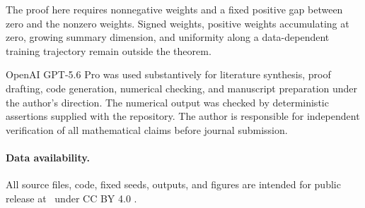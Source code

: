 \documentclass[
  aps,
  prl,
  10pt,
  onecolumn,
  longbibliography,
  nofootinbib
]{revtex4-2}
\theoremstyle{remark}
\begin{document}
The proof here requires nonnegative weights and a fixed positive gap between zero and the nonzero weights. Signed weights, positive weights accumulating at zero, growing summary dimension, and uniformity along a data-dependent training trajectory remain outside the theorem.

\begin{acknowledgments}
OpenAI GPT-5.6 Pro was used substantively for literature synthesis, proof drafting, code generation, numerical checking, and manuscript preparation under the author's direction. The numerical output was checked by deterministic assertions supplied with the repository. The author is responsible for independent verification of all mathematical claims before journal submission.
\end{acknowledgments}

\paragraph*{Data availability.}
All source files, code, fixed seeds, outputs, and figures are intended for public release at \RepositoryURL\ under CC BY 4.0 \cite{PetkovRepository}.


\end{document}
